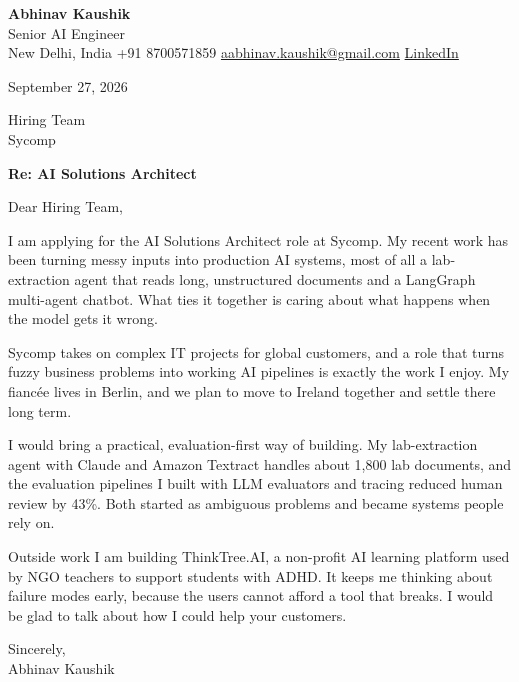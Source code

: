 \documentclass[11pt,a4paper]{article}
\begin{document}
{\Large\bfseries Abhinav Kaushik}\\
Senior AI Engineer\\
New Delhi, India \textbar{} +91 8700571859 \textbar{} \href{mailto:aabhinav.kaushik@gmail.com}{aabhinav.kaushik@gmail.com} \textbar{} \href{https://www.linkedin.com/in/abhinav-kaushik10/}{LinkedIn}  

September 27, 2026

Hiring Team\\
Sycomp

\textbf{Re: AI Solutions Architect}

Dear Hiring Team,

I am applying for the AI Solutions Architect role at Sycomp. My recent work has been turning messy inputs into production AI systems, most of all a lab-extraction agent that reads long, unstructured documents and a LangGraph multi-agent chatbot. What ties it together is caring about what happens when the model gets it wrong.

Sycomp takes on complex IT projects for global customers, and a role that turns fuzzy business problems into working AI pipelines is exactly the work I enjoy. My fiancée lives in Berlin, and we plan to move to Ireland together and settle there long term.

I would bring a practical, evaluation-first way of building. My lab-extraction agent with Claude and Amazon Textract handles about 1,800 lab documents, and the evaluation pipelines I built with LLM evaluators and tracing reduced human review by 43\%. Both started as ambiguous problems and became systems people rely on.

Outside work I am building ThinkTree.AI, a non-profit AI learning platform used by NGO teachers to support students with ADHD. It keeps me thinking about failure modes early, because the users cannot afford a tool that breaks. I would be glad to talk about how I could help your customers.

Sincerely,\\[4pt]
Abhinav Kaushik
\end{document}
